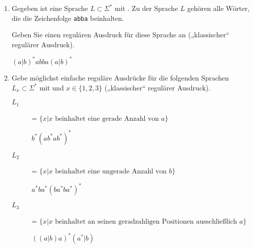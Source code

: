 \documentclass{bschlangaul-aufgabe}
\begin{document}
\begin{enumerate}

%

\item Gegeben ist eine Sprache $L \subset \Sigma^*$ mit
. Zu der Sprache $L$ gehören alle Wörter, die die
Zeichenfolge \texttt{abba} beinhalten.

Geben Sie einen regulären Ausdruck für diese Sprache an („klassischer“
regulärer Ausdruck).

\begin{bAntwort}
$(a|b)^*abba(a|b)^*$

\end{bAntwort}

%

\item Gebe möglichst einfache reguläre Ausdrücke für die folgenden
Sprachen $L_x \subset \Sigma^*$ mit  und $x \in \{1, 2, 3\}$ („klassischer“ regulärer Ausdruck).

\begin{description}

%

\item[$L_1$] = $\{ x | x \text{ beinhaltet eine gerade Anzahl von } a \}$

\begin{bAntwort}
$b^*(ab^*ab^*)^*$

\end{bAntwort}

%

\item[$L_2$] = $\{ x | x \text{ beinhaltet eine ungerade Anzahl von } b \}$

\begin{bAntwort}
$a^*ba^*(ba^*ba^*)^*$

\end{bAntwort}

%

\item[$L_3$] = $\{ x | x \text{ beinhaltet an seinen geradzahligen Positionen ausschließlich } a \}$

\begin{bAntwort}
$((a|b)a)^*(a^*|b)$


\end{bAntwort}
\end{description}
\end{enumerate}
\end{document}
